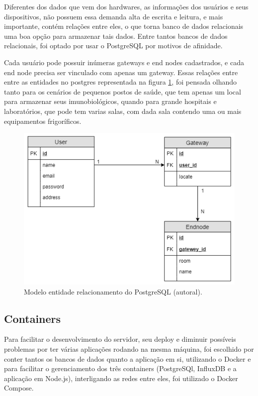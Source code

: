 Diferentes dos dados que vem dos hardwares, as informações dos usuários e seus dispositivos, não possuem essa demanda alta de escrita e leitura, e mais importante, contém relações entre eles, o que torna banco de dados relacionais uma boa opção para armazenar tais dados. Entre tantos bancos de dados relacionais, foi optado por usar o PostgreSQL por motivos de afinidade.

Cada usuário pode possuir inúmeras gateways e end nodes cadastrados, e cada end node precisa ser vinculado com apenas um gateway. Essas relações entre entre as entidades no postgres representada na figura \ref{fig:postgres-model}, foi pensada olhando tanto para os cenários de pequenos postos de saúde, que tem apenas um local para armazenar seus imunobiológicos, quando para grande hospitais e laboratórios, que pode tem varias salas, com dada sala contendo uma ou mais equipamentos frigoríficos.

\begin{figure}[H]
  \centering
  \includegraphics[width=.80\textwidth]{assets/postgres-model.png} 
  \caption{Modelo entidade relacionamento do PostgreSQL (autoral).}
  \label{fig:postgres-model} 
\end{figure}

\subsection{Containers}
\label{metod:servidor:containers}
Para facilitar o desenvolvimento do servidor, seu deploy e diminuir possíveis problemas por ter várias aplicações rodando na mesma máquina, foi escolhido por conter tantos os bancos de dados quanto a aplicação em si, utilizando o Docker e para facilitar o gerenciamento dos três containers (PostgreSQl, InfluxDB e a aplicação em Node.js), interligando as redes entre eles, foi utilizado o Docker Compose.

